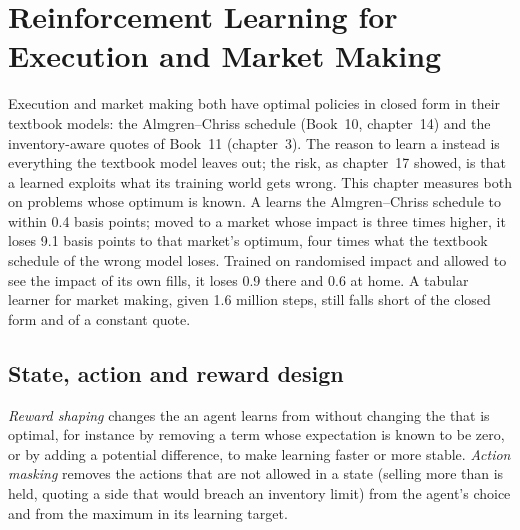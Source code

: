 \chapter{Reinforcement Learning for Execution and Market Making}\label{ch:ml:reinforcement-learning-for-execution-and-market-making}

Execution and market making both have optimal policies in closed form in their textbook models: the Almgren--Chriss
schedule (Book~10, chapter~14) and the inventory-aware quotes of Book~11 (chapter~3). The reason to learn a  instead
is everything the textbook model leaves out; the risk, as chapter~17 showed, is that a learned  exploits what its
training world gets wrong. This chapter measures both on problems whose optimum is known. A  learns the
Almgren--Chriss schedule to within 0.4 basis points; moved to a market whose impact is three times higher, it loses 9.1
basis points to that market's optimum, four times what the textbook schedule of the wrong model loses. Trained on randomised
impact and allowed to see the impact of its own fills, it loses 0.9 there and 0.6 at home. A tabular learner for market
making, given 1.6 million steps, still falls short of the closed form and of a constant quote.

\section{State, action and reward design}

\begin{definition}\label{def:ml:reinforcement-learning-for-execution-and-market-making:design}
\emph{Reward shaping} changes the  an agent learns from without changing the  that is
optimal, for instance by removing a term whose expectation is known to be zero, or by adding a potential difference, to make
learning faster or more stable. \emph{Action masking} removes the actions that are not allowed in a
state (selling more than is held, quoting a side that would breach an inventory limit) from the agent's choice and from the
maximum in its learning target.
\end{definition}

